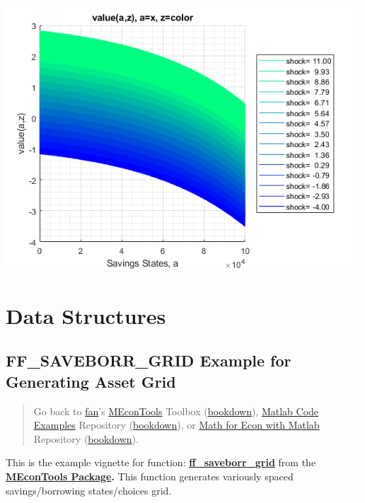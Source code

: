 \documentclass[
]{book}
\begin{document}
\includegraphics[width=5.20833in,height=\textheight]{img/fx_graph_grid_images/figure_7.png}

\hypertarget{data-structures}{%
\chapter{Data Structures}\label{data-structures}}

\hypertarget{ff_saveborr_grid-example-for-generating-asset-grid}{%
\section{FF\_SAVEBORR\_GRID Example for Generating Asset Grid}\label{ff_saveborr_grid-example-for-generating-asset-grid}}

\begin{quote}
Go back to \href{http://fanwangecon.github.io/}{fan}'s \href{https://fanwangecon.github.io/MEconTools/}{MEconTools} Toolbox (\href{https://fanwangecon.github.io/MEconTools/bookdown}{bookdown}), \href{https://fanwangecon.github.io/M4Econ/}{Matlab Code Examples} Repository (\href{https://fanwangecon.github.io/M4Econ/bookdown}{bookdown}), or \href{https://fanwangecon.github.io/Math4Econ/}{Math for Econ with Matlab} Repository (\href{https://fanwangecon.github.io/Math4Econ/bookdown}{bookdown}).
\end{quote}

This is the example vignette for function:
\href{https://github.com/FanWangEcon/MEconTools/blob/master/MEconTools/generate/ff_saveborr_grid.m}{\textbf{ff\_saveborr\_grid}}
from the \href{https://fanwangecon.github.io/MEconTools/}{\textbf{MEconTools
Package}}\textbf{.} This function
generates variously spaced savings/borrowing states/choices grid.
\end{document}
